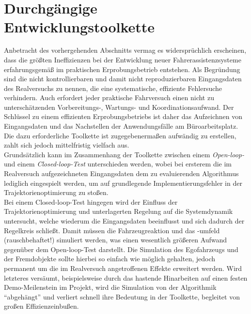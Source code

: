 \section{Durchgängige Entwicklungstoolkette}
Anbetracht des vorhergehenden Abschnitts vermag es widersprüchlich erscheinen, dass die größten Ineffizienzen bei der Entwicklung neuer Fahrerassistenzsysteme erfahrungsgemäß im praktischen Erprobungsbetrieb entstehen. Als Begründung sind die nicht kontrollierbaren und damit nicht reproduzierbaren Eingangsdaten des Realversuchs zu nennen, die eine systematische, effiziente Fehlersuche verhindern. Auch erfordert jeder praktische Fahrversuch einen nicht zu unterschätzenden Vorbereitungs-, Wartungs- und Koordinationsaufwand. Der Schlüssel zu einem effizienten Erprobungsbetriebs ist daher das Aufzeichnen von Eingangsdaten und das Nachstellen der Anwendungsfälle am Büroarbeitsplatz. Die dazu erforderliche Toolkette ist zugegebenermaßen aufwändig zu erstellen, zahlt sich jedoch mittelfristig vielfach aus. \\
Grundsätzlich kann im Zusammenhang der Toolkette zwischen einem \emph{Open-loop-} und einem \emph{Closed-loop-Test} unterschieden werden, wobei bei ersterem die im Realversuch aufgezeichneten Eingangsdaten dem zu evaluierenden Algorithmus lediglich eingespielt werden, um auf grundlegende Implementierungsfehler in der Trajektorienoptimierung zu stoßen. \\
Bei einem Closed-loop-Test hingegen wird der Einfluss der Trajektorienoptimierung und unterlagerten Regelung auf die Systemdynamik untersucht, welche wiederum die Eingangsdaten beeinflusst und sich dadurch der Regelkreis schließt. Damit müssen die Fahrzeugreaktion und das -umfeld (rauschbehaftet!) simuliert werden, was einen wesentlich größeren Aufwand gegenüber dem Open-loop-Test darstellt. Die Simulation des Egofahrzeugs und der Fremdobjekte sollte hierbei so einfach wie möglich gehalten, jedoch permanent um die im Realversuch angetroffenen Effekte erweitert werden. Wird letzteres versäumt, beispielsweise durch das hastende Hinarbeiten auf einen festen Demo-Meilenstein im Projekt, wird die Simulation von der Algorithmik "`abgehängt"' und verliert schnell ihre Bedeutung in der Toolkette, begleitet von großen Effizienzeinbußen.

